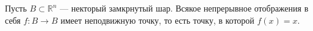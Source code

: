 \begin{to_thr}
	Пусть $B \subset \mathbb{R}^n$ --- некторый замкрнутый шар. Всякое непрерывное отображения в себя $f \colon B \rightarrow B$ имеет неподвижную точку, то есть точку, в которой $f(x) = x$.
\end{to_thr}